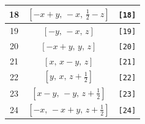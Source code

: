 \documentclass[fleqn,8pt]{jsarticle}
\begin{document}
\begin{longtable}{ccc}
18 & $\left[ - x + y,\, - x,\, \frac{1}{2} - z \right]$ & {\tt [18]} \\ \hline
19 & $\left[ - y,\, - x,\, z \right]$ & {\tt [19]} \\ \hline
20 & $\left[ - x + y,\, y,\, z \right]$ & {\tt [20]} \\ \hline
21 & $\left[ x,\, x - y,\, z \right]$ & {\tt [21]} \\ \hline
22 & $\left[ y,\, x,\, z + \frac{1}{2} \right]$ & {\tt [22]} \\ \hline
23 & $\left[ x - y,\, - y,\, z + \frac{1}{2} \right]$ & {\tt [23]} \\ \hline
24 & $\left[ - x,\, - x + y,\, z + \frac{1}{2} \right]$ & {\tt [24]} \\
\end{longtable}
\end{document}
